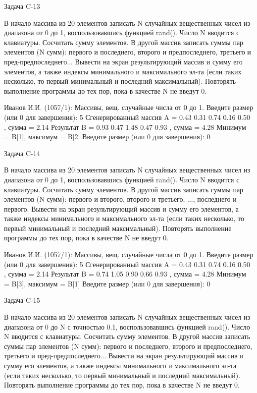 Задача C-13

В начало массива из 20 элементов записать N случайных вещественных чисел из
диапазона от 0 до 1, воспользовавшись функцией rand(). Число N вводится с
клавиатуры. Сосчитать сумму элементов. В другой массив записать суммы пар
элементов (N сумм): первого и последнего, второго и предпоследнего, третьего и
пред-предпоследнего... Вывести на экран результирующий массив и сумму его
элементов, а также индексы минимального и максимального эл-та (если таких
несколько, то первый минимальный и последний максимальный). Повторять
выполнение программы до тех пор, пока в качестве N не введут 0.

Иванов И.И. (1057/1): Массивы, вещ. случайные числа от 0 до 1.
Введите размер (или 0 для завершения): 5
Сгенерированный массив A = { 0.43 0.31 0.74 0.16 0.50 }, сумма = 2.14
Результат B = { 0.93 0.47 1.48 0.47 0.93 }, сумма = 4.28
Минимум = B[1], максимум = B[2]
Введите размер (или 0 для завершения): 0


Задача C-14

В начало массива из 20 элементов записать N случайных вещественных чисел из
диапазона от 0 до 1, воспользовавшись функцией rand(). Число N вводится с
клавиатуры. Сосчитать сумму элементов. В другой массив записать суммы пар
элементов (N сумм): первого и второго, второго и третьего, ..., последнего и
первого. Вывести на экран результирующий массив и сумму его элементов, а также
индексы минимального и максимального эл-та (если таких несколько, то первый
минимальный и последний максимальный). Повторять выполнение программы до тех
пор, пока в качестве N не введут 0.

Иванов И.И. (1057/1): Массивы, вещ. случайные числа от 0 до 1.
Введите размер (или 0 для завершения): 5
Сгенерированный массив A = { 0.43 0.31 0.74 0.16 0.50 }, сумма = 2.14
Результат B = { 0.74 1.05 0.90 0.66 0.93 }, сумма = 4.28
Минимум = B[3], максимум = B[1]
Введите размер (или 0 для завершения): 0


Задача C-15

В начало массива из 20 элементов записать N случайных вещественных чисел из
диапазона от 0 до N с точностью 0.1, воспользовавшись функцией rand(). Число N
вводится с клавиатуры. Сосчитать сумму элементов. В другой массив записать
суммы пар элементов (N сумм): первого и последнего, второго и предпоследнего,
третьего и пред-предпоследнего... Вывести на экран результирующий массив и
сумму его элементов, а также индексы минимального и максимального эл-та (если
таких несколько, то первый минимальный и последний максимальный). Повторять
выполнение программы до тех пор, пока в качестве N не введут 0.

